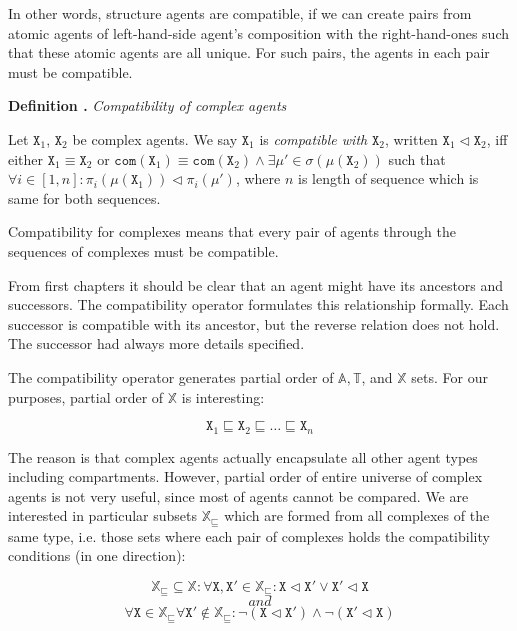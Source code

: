 \documentclass[12pt]{fithesis2}
\newcounter{counter}[section]
\renewcommand{\thecounter}{\thesection.\arabic{counter}}
\newenvironment{definition}[1]{\bigskip\refstepcounter{counter}\noindent\textbf{Definition \thecounter } \textit{#1} \par\nopagebreak}{\bigskip}
\begin{document}
In other words, structure agents are compatible, if we can create pairs from atomic agents of left-hand-side agent's composition with the right-hand-ones such that these atomic agents are all unique. For such pairs, the agents in each pair must be compatible.

\begin{definition}{Compatibility of complex agents}
Let $\mathtt{X}_1$, $\mathtt{X}_2$ be complex agents. We say $\mathtt{X}_1$ is \emph{compatible with} $\mathtt{X}_2$, written $\mathtt{X}_1 \lhd \mathtt{X}_2$, iff either $\mathtt{X}_1 \equiv \mathtt{X}_2$ or $\mathtt{com}(\mathtt{X}_1) \equiv \mathtt{com}(\mathtt{X}_2) \wedge \exists \mu' \in \sigma(\mu(\mathtt{X}_2))$ such that $ \forall i \in [1, n] : \pi_i(\mu(\mathtt{X}_1)) \lhd \pi_i(\mu') $, where $n$ is length of sequence which is same for both sequences.
\end{definition}

Compatibility for complexes means that every pair of agents through the sequences of complexes must be compatible.

From first chapters it should be clear that an agent might have its ancestors and successors. The compatibility operator formulates this relationship formally. Each successor is compatible with its ancestor, but the reverse relation does not hold. The successor had always more details specified.

The compatibility operator generates partial order of $\mathds{A}, \mathds{T}$, and $\mathds{X}$ sets. For our purposes, partial order of $\mathds{X}$ is interesting:

$$ \mathtt{X}_1 \sqsubseteq \mathtt{X}_2 \sqsubseteq \ldots \sqsubseteq \mathtt{X}_n $$

The reason is that complex agents actually encapsulate all other agent types including compartments. However, partial order of entire universe of complex agents is not very useful, since most of agents cannot be compared. We are interested in particular subsets $\mathds{X}_\sqsubseteq$ which are formed from all complexes of the same type, i.e. those sets where each pair of complexes holds the compatibility conditions (in one direction):

$$ \mathds{X}_\sqsubseteq \subseteq \mathds{X} : \forall \mathtt{X}, \mathtt{X}' \in \mathds{X}_\sqsubseteq : \mathtt{X} \lhd \mathtt{X}' \vee \mathtt{X}' \lhd \mathtt{X} $$ $$and$$ $$ \forall \mathtt{X} \in \mathds{X}_\sqsubseteq \forall \mathtt{X}' \not\in \mathds{X}_\sqsubseteq : \neg (\mathtt{X} \lhd \mathtt{X}') \wedge \neg (\mathtt{X}' \lhd \mathtt{X}) $$
\end{document}
